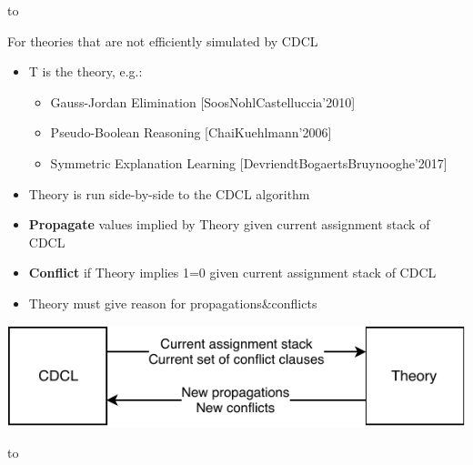 \documentclass[aspectratio=196]{slides}
\def\TITLE#1{\hbox to \linewidth{\large #1\hfill}}
\def\BOTTOM{\vfill\newpage}
\def\SLIDE#1{\BOTTOM\TITLE{#1}}
\begin{document}
\vfill
\newpage


\SLIDE{CDCL(T)}

For theories that are not efficiently simulated by CDCL

\begin{itemize}
\item T is the theory, e.g.:
\begin{itemize}
\item Gauss-Jordan Elimination [SoosNohlCastelluccia'2010]
\item Pseudo-Boolean Reasoning [ChaiKuehlmann'2006]
\item Symmetric Explanation Learning [DevriendtBogaertsBruynooghe'2017]
\end{itemize}
\item Theory is run side-by-side to the CDCL algorithm
\item \textbf{Propagate} values implied by Theory given current assignment stack of CDCL
\item \textbf{Conflict} if Theory implies 1=0 given current assignment stack of CDCL
\item Theory must give reason for propagations\&conflicts
\end{itemize}

\begin{center}
\includegraphics[width=24cm]{CDCL-T}
\end{center}

\vfill
\newpage
\SLIDE{CDCL(T) Cont.}
\end{document}
